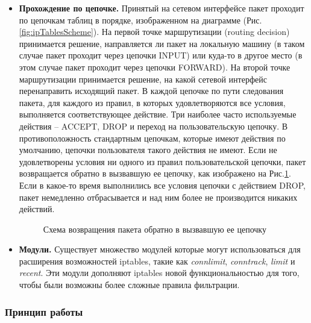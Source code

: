 \documentclass[a4paper]{article}
\begin{document}
\begin{itemize}
		\item 
		\textbf{Прохождение по цепочке.} Принятый на сетевом интерфейсе пакет проходит по цепочкам таблиц в порядке, изображенном на диаграмме (Рис. \ref{fig:ipTablesScheme}). На первой точке маршрутизации (routing decision) принимается решение, направляется ли пакет на локальную машину (в таком случае пакет проходит через цепочки INPUT) или куда-то в другое место (в этом случае пакет проходит через цепочки FORWARD). На второй точке маршрутизации принимается решение, на какой сетевой интерфейс перенаправить исходящий пакет. В каждой цепочке по пути следования пакета, для каждого из правил, в которых удовлетворяются все условия, выполняется соответствующее действие. Три наиболее часто используемые действия -- ACCEPT, DROP и переход на пользовательскую цепочку. В противоположность стандартным цепочкам, которые имеют действия по умолчанию, цепочки пользователя такого действия не имеют. Если не удовлетворены условия ни одного из правил пользовательской цепочки, пакет возвращается обратно в вызвавшую ее цепочку, как изображено на Рис.\ref{fig:packageRet}. Если в какое-то время выполнились все условия цепочки с действием DROP, пакет немедленно отбрасывается и над ним более не производится никаких действий.
			\begin{figure}[h]
				\caption{Схема возвращения пакета обратно в вызвавшую ее цепочку}
				\label{fig:packageRet}
			\end{figure}
		\item 
		\textbf{Модули.} Существует множество модулей которые могут использоваться для расширения возможностей iptables, такие как \emph{connlimit}, \emph{conntrack}, \emph{limit} и \emph{recent}. Эти модули дополняют iptables новой функциональностью для того, чтобы были возможны более сложные правила фильтрации.
	\end{itemize}

	\subsubsection{Принцип работы}
	
\end{document}
